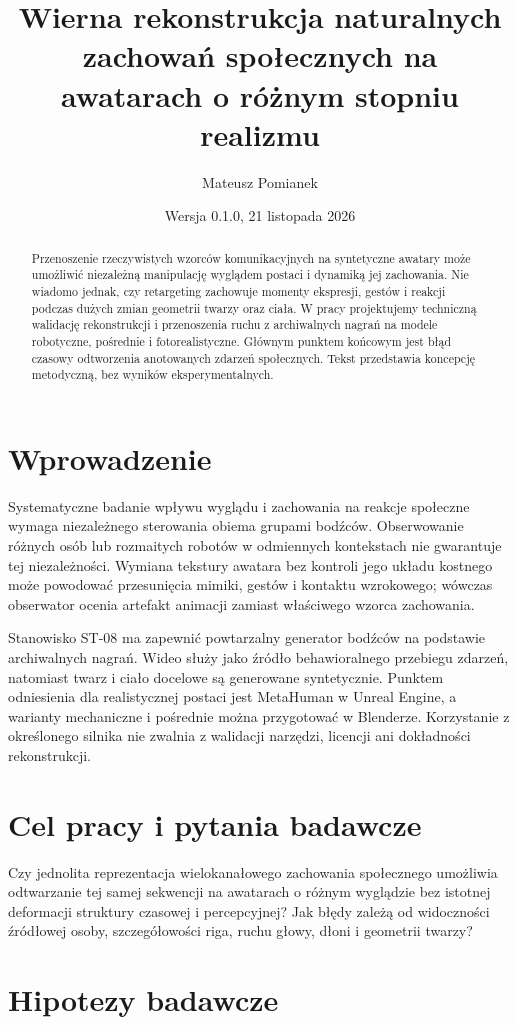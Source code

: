 \documentclass[11pt,a4paper]{article}
\title{Wierna rekonstrukcja naturalnych zachowań społecznych na awatarach o różnym stopniu realizmu}
\author{Mateusz Pomianek}
\date{Wersja 0.1.0, 21 listopada 2026}
\begin{document}
\maketitle
\begin{abstract}
Przenoszenie rzeczywistych wzorców komunikacyjnych na syntetyczne awatary może umożliwić niezależną manipulację wyglądem postaci i dynamiką jej zachowania. Nie wiadomo jednak, czy retargeting zachowuje momenty ekspresji, gestów i reakcji podczas dużych zmian geometrii twarzy oraz ciała. W pracy projektujemy techniczną walidację rekonstrukcji i przenoszenia ruchu z archiwalnych nagrań na modele robotyczne, pośrednie i fotorealistyczne. Głównym punktem końcowym jest błąd czasowy odtworzenia anotowanych zdarzeń społecznych. Tekst przedstawia koncepcję metodyczną, bez wyników eksperymentalnych.
\end{abstract}
\section{Wprowadzenie}
Systematyczne badanie wpływu wyglądu i zachowania na reakcje społeczne wymaga niezależnego sterowania obiema grupami bodźców. Obserwowanie różnych osób lub rozmaitych robotów w odmiennych kontekstach nie gwarantuje tej niezależności. Wymiana tekstury awatara bez kontroli jego układu kostnego może powodować przesunięcia mimiki, gestów i kontaktu wzrokowego; wówczas obserwator ocenia artefakt animacji zamiast właściwego wzorca zachowania.

Stanowisko ST-08 ma zapewnić powtarzalny generator bodźców na podstawie archiwalnych nagrań. Wideo służy jako źródło behawioralnego przebiegu zdarzeń, natomiast twarz i ciało docelowe są generowane syntetycznie. Punktem odniesienia dla realistycznej postaci jest MetaHuman w Unreal Engine, a warianty mechaniczne i pośrednie można przygotować w Blenderze. Korzystanie z określonego silnika nie zwalnia z walidacji narzędzi, licencji ani dokładności rekonstrukcji.
\section{Cel pracy i pytania badawcze}
Czy jednolita reprezentacja wielokanałowego zachowania społecznego umożliwia odtwarzanie tej samej sekwencji na awatarach o różnym wyglądzie bez istotnej deformacji struktury czasowej i percepcyjnej? Jak błędy zależą od widoczności źródłowej osoby, szczegółowości riga, ruchu głowy, dłoni i geometrii twarzy?
\section{Hipotezy badawcze}
\end{document}
